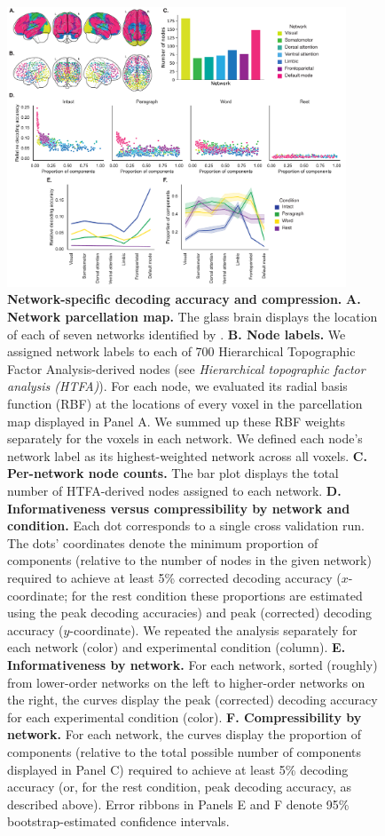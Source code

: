 \documentclass[english, 11pt]{article}
\begin{document}
\begin{figure}[tp]
  \centering
  \includegraphics[width=0.9\textwidth]{figs/network_results}

  \caption{\textbf{Network-specific decoding accuracy and compression.}
  \textbf{A. Network parcellation map.} The glass brain displays the location
  of each of seven networks identified by \cite{YeoEtal11}. \textbf{B. Node
  labels.} We assigned network labels to each of 700 Hierarchical Topographic
  Factor Analysis-derived nodes (see \textit{Hierarchical topographic factor
  analysis (HTFA)}). For each node, we evaluated its radial basis function
  (RBF) at the locations of every voxel in the parcellation map displayed in
  Panel A. We summed up these RBF weights separately for the voxels in each
  network. We defined each node's network label as its highest-weighted network
  across all voxels. \textbf{C. Per-network node counts.} The bar plot displays
  the total number of HTFA-derived nodes assigned to each network. \textbf{D.
  Informativeness versus compressibility by network and condition.} Each dot
  corresponds to a single cross validation run. The dots' coordinates denote
  the minimum proportion of components (relative to the number of nodes in the
  given network) required to achieve at least 5\% corrected decoding accuracy
  ($x$-coordinate; for the rest condition these proportions are estimated using
  the peak decoding accuracies) and peak (corrected) decoding accuracy
  ($y$-coordinate). We repeated the analysis separately for each network
  (color) and experimental condition (column). \textbf{E. Informativeness by
  network.} For each network, sorted (roughly) from lower-order networks on the
  left to higher-order networks on the right, the curves display the peak
  (corrected) decoding accuracy for each experimental condition (color).
  \textbf{F. Compressibility by network.} For each network, the curves display
  the proportion of components (relative to the total possible number of
  components displayed in Panel C) required to achieve at least 5\% decoding
  accuracy (or, for the rest condition, peak decoding accuracy, as described
  above). Error ribbons in Panels E and F denote 95\% bootstrap-estimated
  confidence intervals.}

  \label{fig:networks}
\end{figure}
\end{document}
